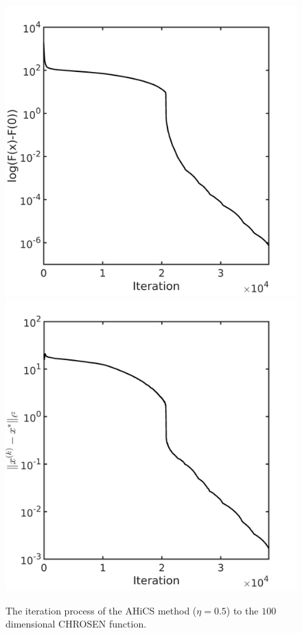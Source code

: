 \documentclass[final,1p,times]{elsarticle}
\begin{document}
\begin{figure}[!htbp]
	\centering
	  \includegraphics[scale=0.18]{../figures/chrosen100D.png}
	  \includegraphics[scale=0.18]{../figures/chrosen100D_dist.png}
  \caption{The iteration process of the AHiCS method
  ($\eta=0.5$) to the $100$ dimensional CHROSEN function.}
	\label{fig:chrosen}
\end{figure}
\end{document}
